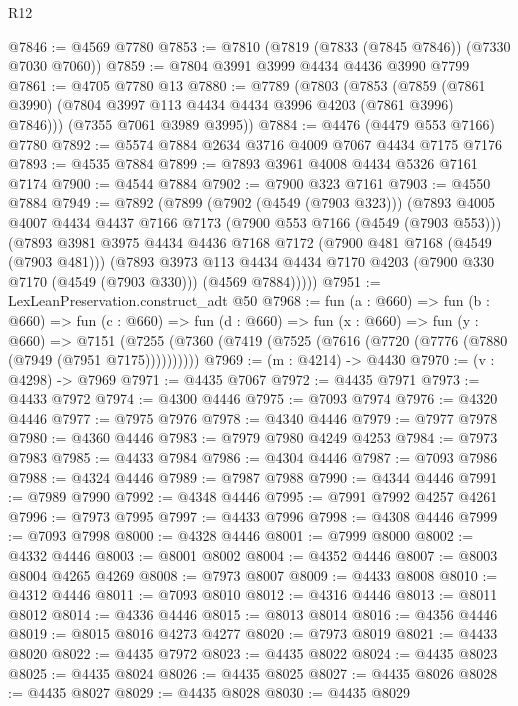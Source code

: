 \begin{lexlean}{R12}
\begin{coremodule}
@7846 := @4569 @7780
@7853 := @7810 (@7819 (@7833 (@7845 @7846)) (@7330 @7030 @7060))
@7859 := @7804 @3991 @3999 @4434 @4436 @3990 @7799
@7861 := @4705 @7780 @13
@7880 := @7789
    (@7803
      (@7853 (@7859 (@7861 @3990) (@7804 @3997 @113 @4434 @4434 @3996 @4203 (@7861 @3996) @7846)))
      (@7355 @7061 @3989 @3995))
@7884 := @4476 (@4479 @553 @7166) @7780
@7892 := @5574 @7884 @2634 @3716 @4009 @7067 @4434 @7175 @7176
@7893 := @4535 @7884
@7899 := @7893 @3961 @4008 @4434 @5326 @7161 @7174
@7900 := @4544 @7884
@7902 := @7900 @323 @7161
@7903 := @4550 @7884
@7949 := @7892
    (@7899
      (@7902 (@4549 (@7903 @323)))
      (@7893
        @4005
        @4007
        @4434
        @4437
        @7166
        @7173
        (@7900 @553 @7166 (@4549 (@7903 @553)))
        (@7893
          @3981
          @3975
          @4434
          @4436
          @7168
          @7172
          (@7900 @481 @7168 (@4549 (@7903 @481)))
          (@7893
            @3973
            @113
            @4434
            @4434
            @7170
            @4203
            (@7900 @330 @7170 (@4549 (@7903 @330)))
            (@4569 @7884)))))
@7951 := LexLeanPreservation.construct_adt @50
@7968 := fun (a : @660) =>
  fun (b : @660) =>
  fun (c : @660) =>
  fun (d : @660) =>
  fun (x : @660) =>
  fun (y : @660) =>
  @7151 (@7255 (@7360 (@7419 (@7525 (@7616 (@7720 (@7776 (@7880 (@7949 (@7951 @7175))))))))))
@7969 := (m : @4214) -> @4430
@7970 := (v : @4298) -> @7969
@7971 := @4435 @7067
@7972 := @4435 @7971
@7973 := @4433 @7972
@7974 := @4300 @4446
@7975 := @7093 @7974
@7976 := @4320 @4446
@7977 := @7975 @7976
@7978 := @4340 @4446
@7979 := @7977 @7978
@7980 := @4360 @4446
@7983 := @7979 @7980 @4249 @4253
@7984 := @7973 @7983
@7985 := @4433 @7984
@7986 := @4304 @4446
@7987 := @7093 @7986
@7988 := @4324 @4446
@7989 := @7987 @7988
@7990 := @4344 @4446
@7991 := @7989 @7990
@7992 := @4348 @4446
@7995 := @7991 @7992 @4257 @4261
@7996 := @7973 @7995
@7997 := @4433 @7996
@7998 := @4308 @4446
@7999 := @7093 @7998
@8000 := @4328 @4446
@8001 := @7999 @8000
@8002 := @4332 @4446
@8003 := @8001 @8002
@8004 := @4352 @4446
@8007 := @8003 @8004 @4265 @4269
@8008 := @7973 @8007
@8009 := @4433 @8008
@8010 := @4312 @4446
@8011 := @7093 @8010
@8012 := @4316 @4446
@8013 := @8011 @8012
@8014 := @4336 @4446
@8015 := @8013 @8014
@8016 := @4356 @4446
@8019 := @8015 @8016 @4273 @4277
@8020 := @7973 @8019
@8021 := @4433 @8020
@8022 := @4435 @7972
@8023 := @4435 @8022
@8024 := @4435 @8023
@8025 := @4435 @8024
@8026 := @4435 @8025
@8027 := @4435 @8026
@8028 := @4435 @8027
@8029 := @4435 @8028
@8030 := @4435 @8029

\end{coremodule}
\end{lexlean}
